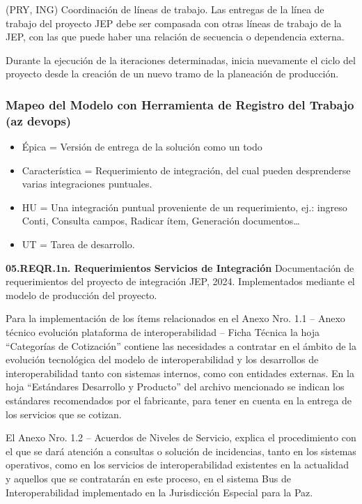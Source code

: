 \documentclass[
  paper=a4,
  ,captions=tableheading
]{scrartcl}
\providecommand{\tightlist}{%
  \setlength{\itemsep}{0pt}\setlength{\parskip}{0pt}}
\begin{document}
(PRY, ING) Coordinación de líneas de trabajo. Las entregas de la línea
de trabajo del proyecto JEP debe ser compasada con otras líneas de
trabajo de la JEP, con las que puede haber una relación de secuencia o
dependencia externa.

Durante la ejecución de la iteraciones determinadas, inicia nuevamente
el ciclo del proyecto desde la creación de un nuevo tramo de la
planeación de producción.

\subsubsection{Mapeo del Modelo con Herramienta de Registro del Trabajo
(az
devops)}\label{sec:mapeo-del-modelo-con-herramienta-de-registro-del-trabajo-az-devops-1}

\begin{itemize}
\tightlist
\item
  Épica = Versión de entrega de la solución como un todo
\item
  Característica = Requerimiento de integración, del cual pueden
  desprenderse varias integraciones puntuales.
\item
  HU = Una integración puntual proveniente de un requerimiento, ej.:
  ingreso Conti, Consulta campos, Radicar ítem, Generación
  documentos\ldots{}
\item
  UT = Tarea de desarrollo.
\end{itemize}

\textbf{05.REQR.1n. Requerimientos Servicios de Integración}
Documentación de requerimientos del proyecto de integración JEP, 2024.
Implementados mediante el modelo de producción del proyecto.

Para la implementación de los ítems relacionados en el Anexo Nro. 1.1 --
Anexo técnico evolución plataforma de interoperabilidad -- Ficha Técnica
la hoja ``Categorías de Cotización'' contiene las necesidades a
contratar en el ámbito de la evolución tecnológica del modelo de
interoperabilidad y los desarrollos de interoperabilidad tanto con
sistemas internos, como con entidades externas. En la hoja ``Estándares
Desarrollo y Producto'' del archivo mencionado se indican los estándares
recomendados por el fabricante, para tener en cuenta en la entrega de
los servicios que se cotizan.

El Anexo Nro. 1.2 -- Acuerdos de Niveles de Servicio, explica el
procedimiento con el que se dará atención a consultas o solución de
incidencias, tanto en los sistemas operativos, como en los servicios de
interoperabilidad existentes en la actualidad y aquellos que se
contratarán en este proceso, en el sistema Bus de Interoperabilidad
implementado en la Jurisdicción Especial para la Paz.
\end{document}
